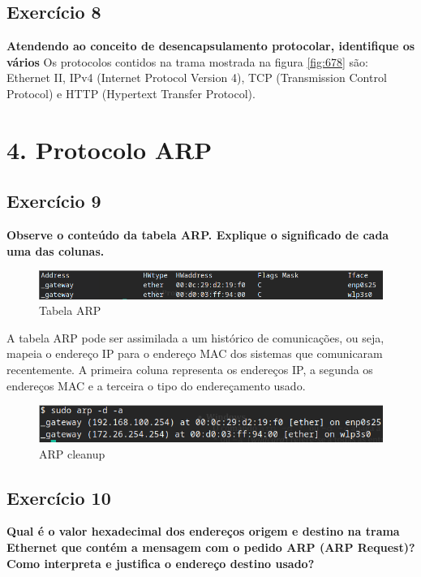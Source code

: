 \documentclass[a4paper]{report}
\begin{document}
\section{Exercício 8}
\textbf{Atendendo ao conceito de desencapsulamento protocolar, identifique os
vários}
Os protocolos contidos na trama mostrada na figura \ref{fig:678} são: Ethernet II,
IPv4 (Internet Protocol Version 4), TCP (Transmission Control Protocol) e HTTP 
(Hypertext Transfer Protocol).

\chapter{4. Protocolo ARP}
\section{Exercício 9}
\textbf{Observe o conteúdo da tabela ARP. Explique o significado de cada uma
das colunas.}

\begin{figure}[H]
    \centering 
    \includegraphics[width=\textwidth]{images/tabelaArp.png}
    \caption{Tabela ARP}
    \label{fig:tabelaArp}
\end{figure}

A tabela ARP pode ser assimilada a um histórico de comunicações, ou seja, mapeia
o endereço IP para o endereço MAC dos sistemas que comunicaram recentemente.
A primeira coluna representa os endereços IP, a segunda os endereços MAC e 
a terceira o tipo do endereçamento usado.

\begin{figure}[H]
    \centering 
    \includegraphics[width=\textwidth]{images/arpCleanup.png}
    \caption{ARP cleanup}
    \label{fig:arpCleanup}
\end{figure}

\section{Exercício 10}
\textbf{Qual é o valor hexadecimal dos endereços origem e destino na trama
Ethernet que contém a mensagem com o pedido ARP (ARP Request)? Como interpreta e
justifica o endereço destino usado?}
\end{document}

